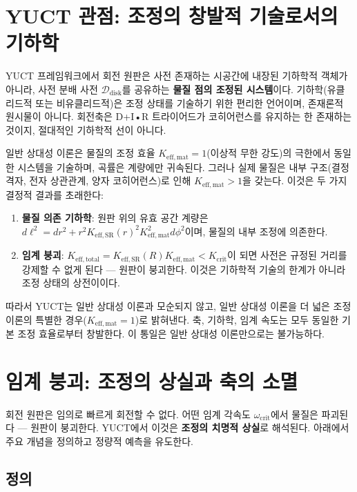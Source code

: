 \documentclass[12pt,a4paper]{article}
\newcommand{\Keffmat}{K_{\mathrm{eff,mat}}}
\newcommand{\Kefftot}{K_{\mathrm{eff,total}}}
\newcommand{\KeffSR}{K_{\mathrm{eff,SR}}}
\newcommand{\Kcrit}{K_{\mathrm{crit}}}
\begin{document}
	\section{YUCT 관점: 조정의 창발적 기술로서의 기하학}
	
	YUCT 프레임워크에서 회전 원판은 사전 존재하는 시공간에 내장된 기하학적 객체가 아니라, 사전 분배 사전 \(\mathcal{D}_{\text{disk}}\)를 공유하는 \textbf{물질 점의 조정된 시스템}이다. 기하학(유클리드적 또는 비유클리드적)은 조정 상태를 기술하기 위한 편리한 언어이며, 존재론적 원시물이 아니다. 회전축은 D+I•R 트라이어드가 코히어런스를 유지하는 한 존재하는 것이지, 절대적인 기하학적 선이 아니다.
	
	일반 상대성 이론은 물질의 조정 효율 \(K_{\mathrm{eff,mat}} = 1\)(이상적 무한 강도)의 극한에서 동일한 시스템을 기술하며, 곡률은 계량에만 귀속된다. 그러나 실제 물질은 내부 구조(결정 격자, 전자 상관관계, 양자 코히어런스)로 인해 \(K_{\mathrm{eff,mat}} > 1\)을 갖는다. 이것은 두 가지 결정적 결과를 초래한다:
	
	\begin{enumerate}
		\item \textbf{물질 의존 기하학}: 원판 위의 유효 공간 계량은 \(d\ell^2 = dr^2 + r^2 K_{\mathrm{eff,SR}}(r)^2 K_{\mathrm{eff,mat}}^2 d\phi^2\)이며, 물질의 내부 조정에 의존한다.
		\item \textbf{임계 붕괴}: \(\Kefftot = \KeffSR(R) \Keffmat < \Kcrit\)이 되면 사전은 규정된 거리를 강제할 수 없게 된다 — 원판이 붕괴한다. 이것은 기하학적 기술의 한계가 아니라 조정 상태의 상전이이다.
	\end{enumerate}
	
	따라서 YUCT는 일반 상대성 이론과 모순되지 않고, 일반 상대성 이론을 더 넓은 조정 이론의 특별한 경우(\(\Keffmat=1\))로 밝혀낸다. 축, 기하학, 임계 속도는 모두 동일한 기본 조정 효율로부터 창발한다. 이 통일은 일반 상대성 이론만으로는 불가능하다.
	
	\section{임계 붕괴: 조정의 상실과 축의 소멸}
	\label{sec:critical-disruption}
	
	회전 원판은 임의로 빠르게 회전할 수 없다. 어떤 임계 각속도 \(\omega_{\text{crit}}\)에서 물질은 파괴된다 — 원판이 붕괴한다. YUCT에서 이것은 \textbf{조정의 치명적 상실}로 해석된다. 아래에서 주요 개념을 정의하고 정량적 예측을 유도한다.
	
	\subsection{정의}
	
\end{document}
